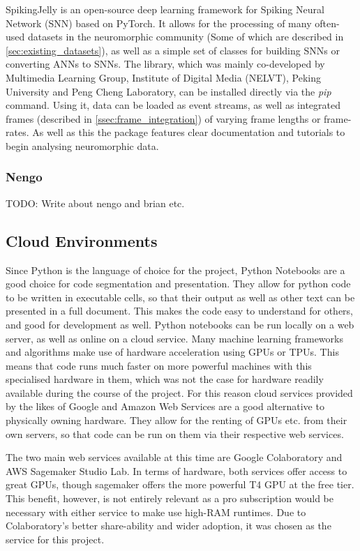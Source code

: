 SpikingJelly\cite{SpikingJelly} is an open-source deep learning framework for Spiking Neural Network (SNN) based on PyTorch. It allows for the processing of many often-used datasets in the neuromorphic community (Some of which are described in \cref{sec:existing_datasets}), as well as a simple set of classes for building SNNs or converting ANNs to SNNs. The library, which was mainly co-developed by Multimedia Learning Group, Institute of Digital Media (NELVT), Peking University and Peng Cheng Laboratory, can be installed directly via the \emph{pip} command. Using it, data can be loaded as event streams, as well as integrated frames (described in \cref{ssec:frame_integration}) of varying frame lengths or frame-rates. As well as this the package features clear documentation and tutorials to begin analysing neuromorphic data.

\subsubsection{Nengo} \label{sssec:nengo}

\color{red} TODO: Write about nengo and brian etc. \color{black}

\subsection{Cloud Environments}

Since Python is the language of choice for the project, Python Notebooks are a good choice for code segmentation and presentation. They allow for python code to be written in executable cells, so that their output as well as other text can be presented in a full document. This makes the code easy to understand for others, and good for development as well. Python notebooks can be run locally on a web server, as well as online on a cloud service. Many machine learning frameworks and algorithms make use of hardware acceleration using GPUs or TPUs. This means that code runs much faster on more powerful machines with this specialised hardware in them, which was not the case for hardware readily available during the course of the project. For this reason cloud services provided by the likes of Google and Amazon Web Services are a good alternative to physically owning hardware. They allow for the renting of GPUs etc. from their own servers, so that code can be run on them via their respective web services. 

The two main web services available at this time are Google Colaboratory\cite{GoogleColab} and AWS Sagemaker Studio Lab\cite{AwsSagemaker}. In terms of hardware, both services offer access to great GPUs, though sagemaker offers the more powerful T4 GPU at the free tier. This benefit, however, is not entirely relevant as a pro subscription would be necessary with either service to make use high-RAM runtimes. Due to Colaboratory's better share-ability and wider adoption, it was chosen as the service for this project.

